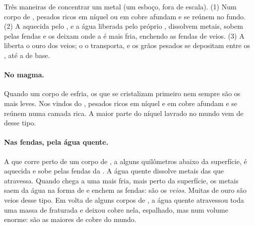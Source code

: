 \begin{omfigure}
{\small Três maneiras de concentrar um metal (um esboço, fora de escala).
(1) Num corpo de ,  pesados ricos em níquel ou em cobre
afundam e se reúnem no fundo. (2) A  aquecida pelo ,
e a água liberada pelo próprio , dissolvem metais, sobem pelas fendas
e os deixam onde a  é mais fria, enchendo as fendas de veios. (3) A
 liberta o ouro dos veios; o  o transporta, e os grãos pesados
se depositam entre os , até a  de base.}
\label{fig:g9:earth-resources:deposits}
\end{omfigure}

\paragraph{No magma.} Quando um corpo de  esfria, os  que
se cristalizam primeiro nem sempre são os mais leves. Nos  vindos
do ,  pesados ricos em níquel e em cobre afundam e se
reúnem numa camada rica. A maior parte do níquel lavrado no mundo vem de
 desse tipo.

\paragraph{Nas fendas, pela água quente.} A  que corre
perto de um corpo de , a alguns quilômetros abaixo da superfície, é
aquecida e sobe pelas fendas da . A água quente dissolve metais das
 que atravessa. Quando chega a uma  mais fria, mais perto da
superfície, os metais saem da água na forma de  e enchem as
fendas: são os \emph{veios}. Muitas  de ouro são
veios desse tipo. Em volta de alguns corpos de , a água quente
atravessou toda uma massa de  fraturada e deixou cobre nela,
espalhado, mas num volume enorme: são as maiores  de cobre do
mundo.

